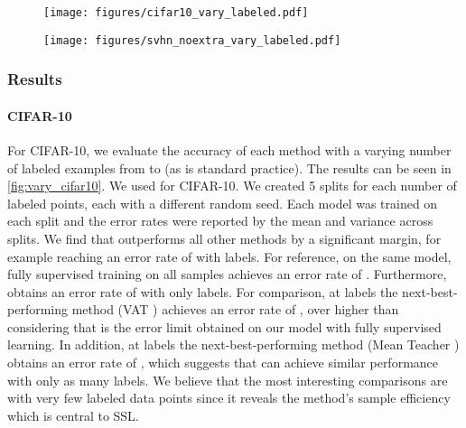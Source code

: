 \documentclass{article}
\begin{document}
\begin{figure}[t]
  \begin{minipage}[l]{\textwidth}
    \begin{minipage}[t]{0.48\textwidth}
      \centering
      \centerline{\texttt{[image: figures/cifar10\_vary\_labeled.pdf]}}
      \label{fig:vary_cifar10}
    \end{minipage}\hfill
    \begin{minipage}[t]{0.48\textwidth}
      \centering
      \centerline{\texttt{[image: figures/svhn\_noextra\_vary\_labeled.pdf]}}
    \label{fig:vary_svhn}
\end{minipage}
  \end{minipage}
\end{figure}

\subsubsection{Results}

\paragraph{CIFAR-10} For CIFAR-10, we evaluate the accuracy of each method with a varying number of labeled examples from  to  (as is standard practice).
The results can be seen in \cref{fig:vary_cifar10}.
We used  for CIFAR-10.
We created 5 splits for each number of labeled points, each with a different random seed.
Each model was trained on each split and the error rates were reported by the mean and variance across splits.
We find that  outperforms all other methods by a significant margin, for example reaching an error rate of  with  labels.
For reference, on the same model, fully supervised training on all  samples achieves an error rate of .
Furthermore,  obtains an error rate of  with only  labels.
For comparison, at  labels the next-best-performing method (VAT \cite{miyato2018virtual}) achieves an error rate of , over  higher than  considering that  is the error limit obtained on our model with fully supervised learning.
In addition, at  labels the next-best-performing method (Mean Teacher \cite{tarvainen2017weight}) obtains an error rate of , which suggests that  can achieve similar performance with only  as many labels.
We believe that the most interesting comparisons are with very few labeled data points since it reveals the method's sample efficiency which is central to SSL. 
\end{document}
